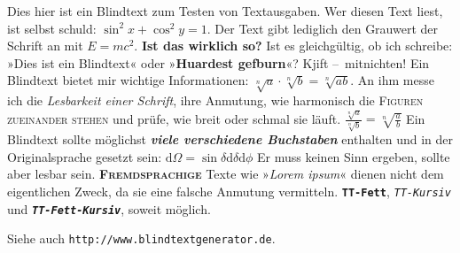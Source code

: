 Dies hier ist ein \textsf{Blindtext} zum Testen von
Textausgaben. Wer diesen Text liest, ist selbst
schuld: $\sin^2x+\cos^2y=1$. Der Text gibt lediglich den Grauwert
der Schrift an mit $E=mc^2$. \textbf{Ist das wirklich so?} Ist es
gleichgültig, ob ich schreibe: »Dies ist ein
\textsf{Blindtext}« oder »\textsf{\textbf{Huardest gefburn}«? Kjift} --~mitnichten! 
Ein \textsf{Blindtext} bietet mir wichtige
Informationen: $\sqrt[n]{a}\cdot\sqrt[n]{b}=\sqrt[n]{ab}$. An ihm messe ich die
\emph{Lesbarkeit einer Schrift}, ihre Anmutung, wie
harmonisch die \textsc{Figuren zueinander stehen} und prüfe, wie breit
oder schmal sie läuft. $\frac{\sqrt[n]{a}}{\sqrt[n]{b}}=\sqrt[n]{\frac{a}{b}}$ Ein \textsf{Blindtext} sollte
möglichst \textit{\bfseries viele verschiedene Buchstaben} enthalten
und in der Originalsprache gesetzt sein: $\mathrm{d}\Omega=\sin\delta\mathrm{d}\delta\mathrm{d}\phi$ Er
muss keinen Sinn ergeben, sollte aber lesbar
sein. {\sffamily \textbf{\textsc{Fremdsprachige}} Texte wie »\textit{Lorem
ipsum}« dienen nicht dem eigentlichen Zweck, da sie eine falsche
Anmutung vermitteln}. \texttt{\textbf{TT-Fett}}, \texttt{\textit{TT-Kursiv}}
und \texttt{\textbf{\textit{TT-Fett-Kursiv}}}, soweit möglich.\par
Siehe auch \texttt{http://www.blindtextgenerator.de}.


